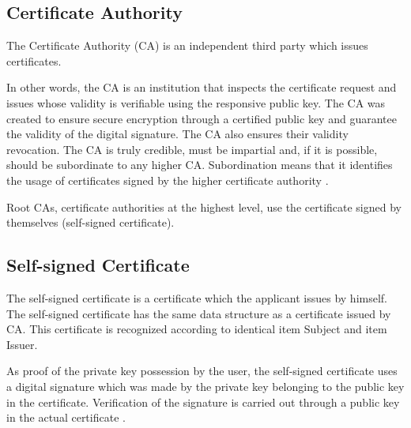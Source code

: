 \documentclass[
  twoside, 12pt, 
  printed, %
  notable,   %
  lof,     %
  lot,     %
]{fithesis3}
\begin{document}
\subsection{Certificate Authority}
The Certificate Authority (CA) is an independent third party which issues certificates.

In other words, the CA is an institution that inspects the certificate request and issues whose 
validity is verifiable using the responsive public key. The CA was created %
to ensure secure encryption through a certified public key and guarantee the validity of the 
digital signature. The CA also ensures their validity revocation. The CA is truly credible, must 
be impartial and, if it is possible, should be subordinate to any higher CA. Subordination means 
that it identifies the usage of certificates signed by the higher certificate authority 
\cite{dostalek2016velky}.

Root CAs, certificate authorities at the highest level, use the certificate signed by 
themselves (self-signed certificate).

\nocite{singh2003kniha}

\subsection{Self-signed Certificate}
The self-signed certificate is a certificate which the applicant issues by himself. The 
self-signed certificate has the same data structure as a certificate issued by CA. This 
certificate is recognized according to identical item Subject and item Issuer.

As proof of the private key possession by the user, the self-signed certificate uses a 
digital signature which was made by the private key belonging to the public key 
in the certificate. Verification of the signature is carried out through a public key in the 
actual certificate \cite{dostalek2016velky}.

\end{document}
